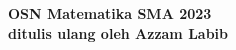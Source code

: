 \begin{center}
    \textbf{\Huge OSN Matematika SMA 2023}\\
    \textbf{\large ditulis ulang oleh Azzam Labib}
\end{center}

% 
% 
